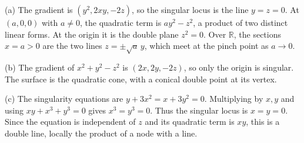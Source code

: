 (a) The gradient is $(y^2,2xy,-2z)$, so the singular locus is the line $y=z=0$. At $(a,0,0)$ with $a\ne0$, the quadratic term is $ay^2-z^2$, a product of two distinct linear forms. At the origin it is the double plane $z^2=0$. Over $\mathbb{R}$, the sections $x=a>0$ are the two lines $z=\pm\sqrt a\,y$, which meet at the pinch point as $a\to0$.

(b) The gradient of $x^2+y^2-z^2$ is $(2x,2y,-2z)$, so only the origin is singular. The surface is the quadratic cone, with a conical double point at its vertex.

(c) The singularity equations are $y+3x^2=x+3y^2=0$. Multiplying by $x,y$ and using $xy+x^3+y^3=0$ gives $x^3=y^3=0$. Thus the singular locus is $x=y=0$. Since the equation is independent of $z$ and its quadratic term is $xy$, this is a double line, locally the product of a node with a line.
